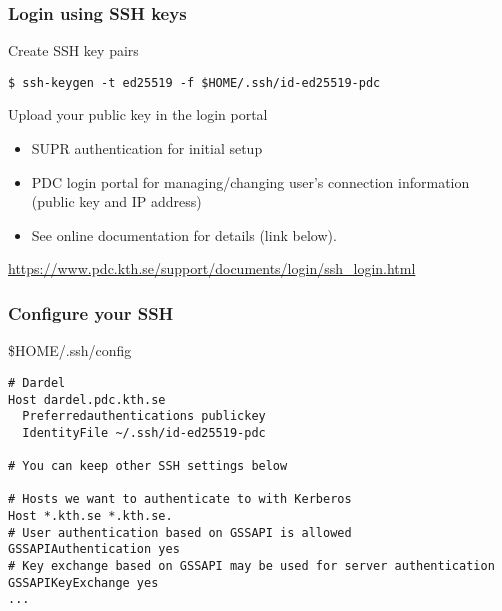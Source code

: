 \begin{frame}[fragile]
\frametitle{Login using SSH keys}

\begin{block}{Create SSH key pairs}
\begin{verbatim}
$ ssh-keygen -t ed25519 -f $HOME/.ssh/id-ed25519-pdc
\end{verbatim}
\end{block}

\begin{block}{Upload your public key in the login portal}
    \begin{itemize}
        \item SUPR authentication for initial setup
        \item PDC login portal for managing/changing user’s connection information (public key and IP address)
        \item See online documentation for details (link below).
    \end{itemize}
\end{block}

\href{https://www.pdc.kth.se/support/documents/login/ssh\_login.html}{https://www.pdc.kth.se/support/documents/login/ssh\_login.html}

\end{frame}


\begin{frame}[fragile]
\frametitle{Configure your SSH}

\begin{block}{\$HOME/.ssh/config}
\begin{verbatim}
# Dardel
Host dardel.pdc.kth.se
  Preferredauthentications publickey
  IdentityFile ~/.ssh/id-ed25519-pdc

# You can keep other SSH settings below

# Hosts we want to authenticate to with Kerberos
Host *.kth.se *.kth.se.
# User authentication based on GSSAPI is allowed
GSSAPIAuthentication yes
# Key exchange based on GSSAPI may be used for server authentication
GSSAPIKeyExchange yes
...
\end{verbatim}
\end{block}

\end{frame}
